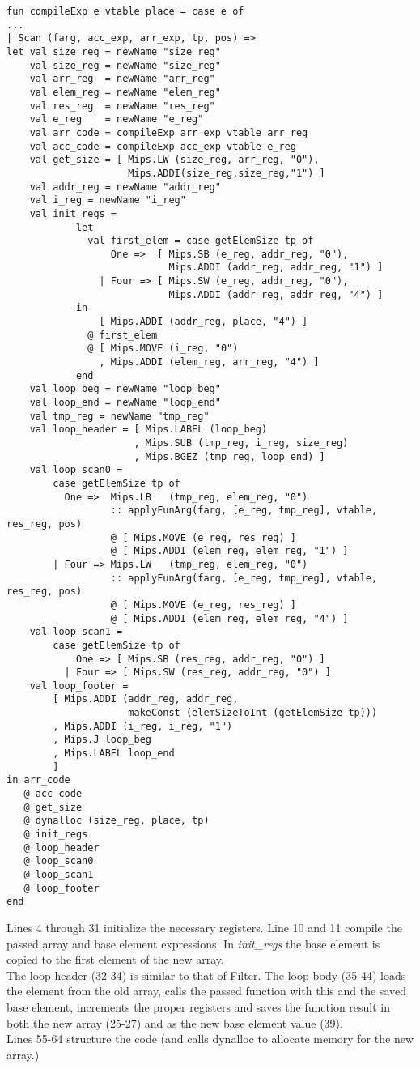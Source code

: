 \documentclass{article}
\begin{document}
\begin{lstlisting}
fun compileExp e vtable place = case e of
...
| Scan (farg, acc_exp, arr_exp, tp, pos) =>
let val size_reg = newName "size_reg" 
    val size_reg = newName "size_reg" 
    val arr_reg  = newName "arr_reg"
    val elem_reg = newName "elem_reg" 
    val res_reg  = newName "res_reg"
    val e_reg    = newName "e_reg"
    val arr_code = compileExp arr_exp vtable arr_reg    
    val acc_code = compileExp acc_exp vtable e_reg
    val get_size = [ Mips.LW (size_reg, arr_reg, "0"),
                     Mips.ADDI(size_reg,size_reg,"1") ]
    val addr_reg = newName "addr_reg"
    val i_reg = newName "i_reg"
    val init_regs = 
    		let
              val first_elem = case getElemSize tp of
                  One =>  [ Mips.SB (e_reg, addr_reg, "0"), 
                            Mips.ADDI (addr_reg, addr_reg, "1") ]
                | Four => [ Mips.SW (e_reg, addr_reg, "0"),
                            Mips.ADDI (addr_reg, addr_reg, "4") ]
            in
                [ Mips.ADDI (addr_reg, place, "4") ]
              @ first_elem
              @ [ Mips.MOVE (i_reg, "0")
                , Mips.ADDI (elem_reg, arr_reg, "4") ]
            end
    val loop_beg = newName "loop_beg"
    val loop_end = newName "loop_end"
    val tmp_reg = newName "tmp_reg"
    val loop_header = [ Mips.LABEL (loop_beg)
                      , Mips.SUB (tmp_reg, i_reg, size_reg)
                      , Mips.BGEZ (tmp_reg, loop_end) ]
    val loop_scan0 =
        case getElemSize tp of
          One =>  Mips.LB   (tmp_reg, elem_reg, "0")
                  :: applyFunArg(farg, [e_reg, tmp_reg], vtable, res_reg, pos)
                  @ [ Mips.MOVE (e_reg, res_reg) ]
                  @ [ Mips.ADDI (elem_reg, elem_reg, "1") ]
        | Four => Mips.LW   (tmp_reg, elem_reg, "0")
                  :: applyFunArg(farg, [e_reg, tmp_reg], vtable, res_reg, pos)
                  @ [ Mips.MOVE (e_reg, res_reg) ]
                  @ [ Mips.ADDI (elem_reg, elem_reg, "4") ]
    val loop_scan1 =
        case getElemSize tp of
            One => [ Mips.SB (res_reg, addr_reg, "0") ]
          | Four => [ Mips.SW (res_reg, addr_reg, "0") ]
    val loop_footer =
        [ Mips.ADDI (addr_reg, addr_reg,
                     makeConst (elemSizeToInt (getElemSize tp)))
        , Mips.ADDI (i_reg, i_reg, "1")
        , Mips.J loop_beg
        , Mips.LABEL loop_end
        ]
in arr_code
   @ acc_code
   @ get_size
   @ dynalloc (size_reg, place, tp)
   @ init_regs
   @ loop_header
   @ loop_scan0
   @ loop_scan1
   @ loop_footer
end	
\end{lstlisting}
\noindent Lines 4 through 31 initialize the necessary registers. Line 10 and 11 compile the passed array and base element expressions. In \textit{init\_regs} the base element is copied to the first element of the new array.\\
The loop header (32-34) is similar to that of Filter. The loop body (35-44) loads the element from the old array, calls the passed function with this and the saved base element, increments the proper registers and saves the function result in both the new array (25-27) and as the new base element value (39).\\
Lines 55-64 structure the code (and calls dynalloc to allocate memory for the new array.)
\end{document}
